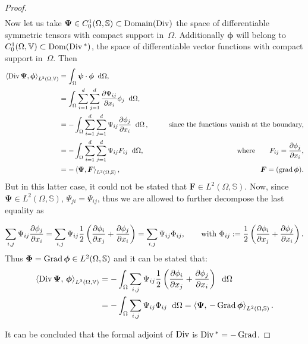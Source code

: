 \begin{theorem}
\begin{proof}
\begin{equation*}
\begin{aligned}
		\end{aligned}
		\end{equation*}
		Now let us take $\bm{\Psi} \in {C}_0^1(\Omega, \mathbb{S}) \subset \mathrm{Domain}(\operatorname*{Div})$ the space of differentiable symmetric tensors with compact support in~$\Omega$. Additionally $\bm{\phi}$ will belong to ${C}_0^1(\Omega, \mathbb{V}) \subset \mathrm{Dom}(\operatorname*{Div}{}^*)$, the space of differentiable vector functions with compact support in~$\Omega$. Then
		\begin{equation*}
		\begin{aligned}
		\left\langle \Div\bm{\Psi} , \bm{\phi} \right\rangle_{L^2(\Omega, \mathbb{V})} &= \int_{\Omega}  \bm{\psi} \cdot \bm{\phi} \; \d\Omega, \\
		&= \int_{\Omega} \sum_{i=1}^d \sum_{j=1}^d \diffp{\Psi_{ij}}{x_i} \phi_j \; \d\Omega,  \\ 
		&= - \int_{\Omega} \sum_{i=1}^d \sum_{j=1}^d \Psi_{ij} \diffp{\phi_j}{x_i} \; \d\Omega\,, \qquad &\text{since the functions vanish at the boundary,}\\
		&= - \int_{\Omega} \sum_{i=1}^d \sum_{j=1}^d \Psi_{ij} {F}_{ij} \;\d\Omega,  \qquad &\where {F}_{ij} = \diffp{\phi_j}{x_i},\\
		&= - \left\langle \bm{\Psi} , \bm{F} \right\rangle_{L^2(\Omega, \mathbb{S})},  \qquad &\bm{F} = (\grad{\bm\phi}).
		\end{aligned}	 
		\end{equation*}
		But in this latter case, it could not  be stated that $\bm{F} \in L^2(\Omega, \mathbb{S})$. Now, since  $\bm{\Psi} \in L^2(\Omega, \mathbb{S})$, $\Psi_{ji}=\Psi_{ij}$,  thus we are  allowed to further decompose the last equality as
		
		\begin{equation*} \sum_{i,j}\Psi_{ij} \diffp{\phi_j}{x_i} = \sum_{i,j}\Psi_{ij} \frac{1}{2} \left(\diffp{\phi_i}{x_j} + \diffp{\phi_j}{x_i}  \right) = 	\sum_{i,j} \Psi_{ij} {\Phi}_{ij}, \qquad \text{with } {\Phi}_{ij}:= \frac{1}{2} \left(\diffp{\phi_i}{x_j} + \diffp{\phi_j}{x_i}  \right).
		\end{equation*}
		Thus $\bm{\Phi}=\operatorname*{Grad} \bm{\phi} \in L^2(\Omega, \mathbb{S})$ and it can be stated that:
		\begin{align*}
		\inner[L^2(\Omega, \mathbb{V})]{\Div\bm{\Psi}}{\bm{\phi}} &= - \int_{\Omega} \sum_{i,j} \Psi_{ij} \frac{1}{2} \left(\diffp{\phi_i}{x_j} + \diffp{\phi_j}{x_i}  \right) \;\d\Omega \\
		&= - \int_{\Omega} \sum_{i,j} \Psi_{ij} \Phi_{ij} \;\d\Omega = \inner[L^2(\Omega, \mathbb{S})]{\bm{\Psi}}{-\Grad \bm{\phi}}.
		\end{align*}

		It can be concluded that the formal adjoint of $\operatorname*{Div}$ is $\operatorname*{Div}{}^* = -\operatorname*{Grad}$.
	\end{proof}
\end{theorem}

